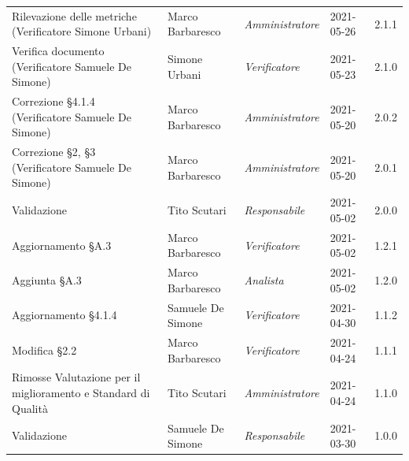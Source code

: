 \documentclass[a4paper]{article}
\begin{document}
\begin{center}
\begin{longtable}[!h]{p{160px} p{80px} p{70px} p{55px} p{40px}}
        Rilevazione delle metriche \newline (Verificatore Simone Urbani)                         & Marco Barbaresco  & \textit{Amministratore} & 2021-05-26    & 2.1.1             \\
        Verifica documento \newline (Verificatore Samuele De Simone)                             & Simone Urbani     & \textit{Verificatore}   & 2021-05-23    & 2.1.0             \\
        Correzione \S 4.1.4 \newline (Verificatore Samuele De Simone)                            & Marco Barbaresco  & \textit{Amministratore} & 2021-05-20    & 2.0.2             \\
        Correzione \S2, \S3 \newline (Verificatore Samuele De Simone)                            & Marco Barbaresco  & \textit{Amministratore} & 2021-05-20    & 2.0.1             \\
        Validazione                                                                              & Tito Scutari      & \textit{Responsabile}   & 2021-05-02    & 2.0.0             \\
        Aggiornamento \S A.3                                                                     & Marco Barbaresco  & \textit{Verificatore}   & 2021-05-02    & 1.2.1             \\
        Aggiunta \S A.3                                                                          & Marco Barbaresco  & \textit{Analista}       & 2021-05-02    & 1.2.0             \\
        Aggiornamento \S 4.1.4                                                                   & Samuele De Simone & \textit{Verificatore}   & 2021-04-30    & 1.1.2             \\
        Modifica \S 2.2                                                                          & Marco Barbaresco  & \textit{Verificatore}   & 2021-04-24    & 1.1.1             \\
        Rimosse Valutazione per il miglioramento e Standard di Qualità                           & Tito Scutari      & \textit{Amministratore} & 2021-04-24    & 1.1.0             \\
        Validazione                                                                              & Samuele De Simone & \textit{Responsabile}   & 2021-03-30    & 1.0.0             \\

\end{longtable}
\end{center}
\end{document}
